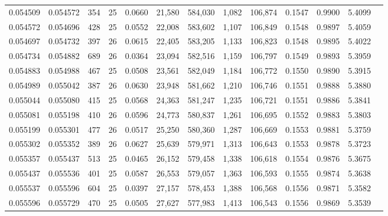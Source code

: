 \begin{tabular}{rrrrrrrrrrrrr}
0.054509 & 0.054572 & 354 &  25 &                                     0.0660 &  21,580 & 584,030 &   1,082 & 106,874 & 0.1547 & 0.9900 & 5.4099 \\
0.054572 & 0.054696 & 428 &  25 &                                     0.0552 &  22,008 & 583,602 &   1,107 & 106,849 & 0.1548 & 0.9897 & 5.4059 \\
0.054697 & 0.054732 & 397 &  26 &                                     0.0615 &  22,405 & 583,205 &   1,133 & 106,823 & 0.1548 & 0.9895 & 5.4022 \\
0.054734 & 0.054882 & 689 &  26 &                                     0.0364 &  23,094 & 582,516 &   1,159 & 106,797 & 0.1549 & 0.9893 & 5.3959 \\
0.054883 & 0.054988 & 467 &  25 &                                     0.0508 &  23,561 & 582,049 &   1,184 & 106,772 & 0.1550 & 0.9890 & 5.3915 \\
0.054989 & 0.055042 & 387 &  26 &                                     0.0630 &  23,948 & 581,662 &   1,210 & 106,746 & 0.1551 & 0.9888 & 5.3880 \\
0.055044 & 0.055080 & 415 &  25 &                                     0.0568 &  24,363 & 581,247 &   1,235 & 106,721 & 0.1551 & 0.9886 & 5.3841 \\
0.055081 & 0.055198 & 410 &  26 &                                     0.0596 &  24,773 & 580,837 &   1,261 & 106,695 & 0.1552 & 0.9883 & 5.3803 \\
0.055199 & 0.055301 & 477 &  26 &                                     0.0517 &  25,250 & 580,360 &   1,287 & 106,669 & 0.1553 & 0.9881 & 5.3759 \\
0.055302 & 0.055352 & 389 &  26 &                                     0.0627 &  25,639 & 579,971 &   1,313 & 106,643 & 0.1553 & 0.9878 & 5.3723 \\
0.055357 & 0.055437 & 513 &  25 &                                     0.0465 &  26,152 & 579,458 &   1,338 & 106,618 & 0.1554 & 0.9876 & 5.3675 \\
0.055437 & 0.055536 & 401 &  25 &                                     0.0587 &  26,553 & 579,057 &   1,363 & 106,593 & 0.1555 & 0.9874 & 5.3638 \\
0.055537 & 0.055596 & 604 &  25 &                                     0.0397 &  27,157 & 578,453 &   1,388 & 106,568 & 0.1556 & 0.9871 & 5.3582 \\
0.055596 & 0.055729 & 470 &  25 &                                     0.0505 &  27,627 & 577,983 &   1,413 & 106,543 & 0.1556 & 0.9869 & 5.3539 \\

\end{tabular}
